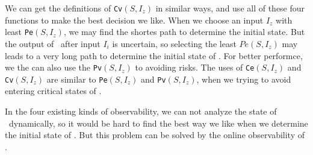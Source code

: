 We can get the definitions of {\tt Cv}$(S, I_z)$ in similar ways, and use all of these four functions to make the best decision we like. When we choose an input $I_z$ with least {\tt Pe}$(S, I_z)$, we may find the shortes path to determine the initial state. But the output of \BCNs\ after input $I_i$ is uncertain, so selecting the least $Pe(S, I_z)$ may leads to a very long path to determine the initial state of \BCNs. For better performce, we the can also use the {\tt Pv}$(S, I_z)$ to avoiding risks. The uses of {\tt Ce}$(S, I_z)$ and {\tt Cv}$(S, I_z)$ are similar to {\tt Pe}$(S, I_z)$ and {\tt Pv}$(S, I_z)$, when we trying to avoid entering critical states of \BCNs.

In the four existing kinds of observability, we can not analyze the state of \BCNs\ dynamically, so it would be hard to find the best way we like when we determine the initial state of \BCNs. But this problem can be solved by the online observability of \BCNs.